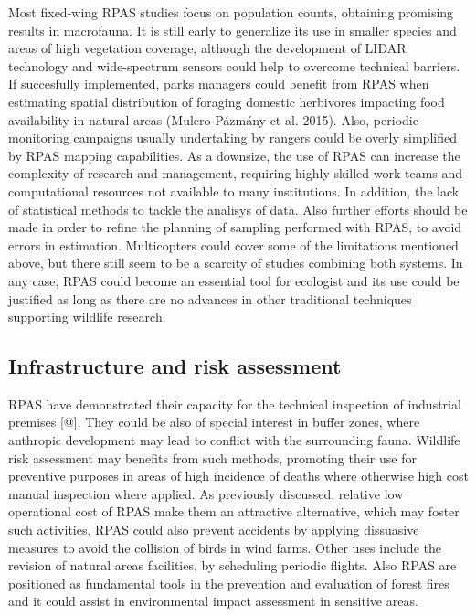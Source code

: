 \documentclass[]{interact}
\theoremstyle{plain}%
\theoremstyle{definition}
\theoremstyle{remark}
\begin{document}
Most fixed-wing RPAS studies focus on population counts, obtaining
promising results in macrofauna. It is still early to generalize its use
in smaller species and areas of high vegetation coverage, although the
development of LIDAR technology and wide-spectrum sensors could help to
overcome technical barriers. If succesfully implemented, parks managers
could benefit from RPAS when estimating spatial distribution of foraging
domestic herbivores impacting food availability in natural areas
(Mulero-Pázmány et al. 2015). Also, periodic monitoring campaigns
usually undertaking by rangers could be overly simplified by RPAS
mapping capabilities. As a downsize, the use of RPAS can increase the
complexity of research and management, requiring highly skilled work
teams and computational resources not available to many institutions. In
addition, the lack of statistical methods to tackle the analisys of
data. Also further efforts should be made in order to refine the
planning of sampling performed with RPAS, to avoid errors in estimation.
Multicopters could cover some of the limitations mentioned above, but
there still seem to be a scarcity of studies combining both systems. In
any case, RPAS could become an essential tool for ecologist and its use
could be justified as long as there are no advances in other traditional
techniques supporting wildlife research.

\subsection{Infrastructure and risk
assessment}\label{infrastructure-and-risk-assessment-1}

RPAS have demonstrated their capacity for the technical inspection of
industrial premises {[}@{]}. They could be also of special interest in
buffer zones, where anthropic development may lead to conflict with the
surrounding fauna. Wildlife risk assessment may benefits from such
methods, promoting their use for preventive purposes in areas of high
incidence of deaths where otherwise high cost manual inspection where
applied. As previously discussed, relative low operational cost of RPAS
make them an attractive alternative, which may foster such activities.
RPAS could also prevent accidents by applying dissuasive measures to
avoid the collision of birds in wind farms. Other uses include the
revision of natural areas facilities, by scheduling periodic flights.
Also RPAS are positioned as fundamental tools in the prevention and
evaluation of forest fires and it could assist in environmental impact
assessment in sensitive areas.
\end{document}

